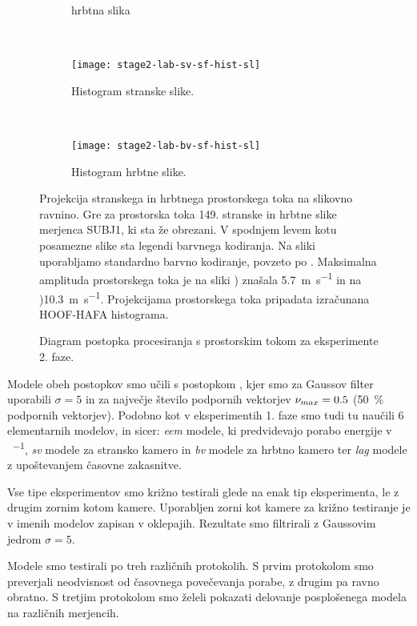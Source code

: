 \begin{figure}[!htb]
\begin{subfigure}[t]{0.45\columnwidth}
		\caption{hrbtna slika}
		\label{fig:stage2-lab-sf-bv-flo}
	\end{subfigure}
	~
	\begin{subfigure}[t]{0.45\columnwidth}
		\texttt{[image: stage2-lab-sv-sf-hist-sl]}
		\caption{Histogram stranske slike.}
	\end{subfigure}
	~
	\begin{subfigure}[t]{0.45\columnwidth}
		\texttt{[image: stage2-lab-bv-sf-hist-sl]}
		\caption{Histogram hrbtne slike.}
	\end{subfigure}
	\caption[Projekcija stranskega in hrbtnega prostorskega toka na slikovno ravnino]{Projekcija stranskega in hrbtnega prostorskega toka na slikovno ravnino. Gre za prostorska toka 149. stranske in hrbtne slike merjenca SUBJ1, ki sta že obrezani. V spodnjem levem kotu posamezne slike sta legendi barvnega kodiranja. Na sliki uporabljamo standardno barvno kodiranje, povzeto po \cite{baker2011database}. Maksimalna amplituda prostorskega toka je na sliki  ) znašala \SI{5.7}{\m\per\s} in na )\SI{10,3}{\m\per\s}. Projekcijama prostorskega toka pripadata izračunana HOOF-HAFA histograma.}
	\label{fig:prostorski-tok-stage2}
\end{figure}

\begin{figure}[!htb]
	\centering
	
	\caption{Diagram postopka procesiranja s prostorskim tokom za eksperimente 2. faze.}
	\label{fig:diagram-procesiranja-sf-stage2}
\end{figure}
 
Modele obeh postopkov smo učili s postopkom \nurbf, kjer smo za Gaussov filter uporabili $\sigma=5$ in za največje število podpornih vektorjev $\nu_{max} =0.5$ (\SI{50}{\%} podpornih vektorjev). Podobno kot v eksperimentih 1. faze smo tudi tu naučili \num{6} elementarnih modelov, in sicer: \textit{eem} modele, ki predvidevajo porabo energije v \si{\kcal\per\min}, \textit{sv} modele za stransko kamero in \textit{bv} modele za hrbtno kamero ter \textit{lag} modele z upoštevanjem časovne zakasnitve.

Vse tipe eksperimentov smo križno testirali glede na enak tip eksperimenta, le z drugim zornim kotom kamere. Uporabljen zorni kot kamere za križno testiranje je v imenih modelov zapisan v oklepajih.  Rezultate smo filtrirali z Gaussovim jedrom $\sigma=5$. 

Modele smo testirali po treh različnih protokolih. S prvim protokolom smo preverjali neodvisnost od časovnega povečevanja porabe, z drugim pa ravno obratno. S tretjim protokolom smo želeli pokazati delovanje posplošenega modela na različnih merjencih.


